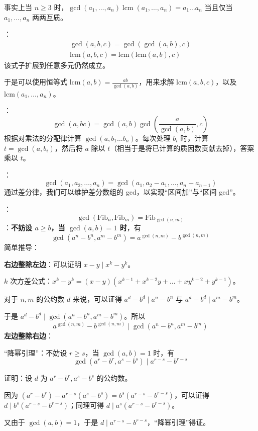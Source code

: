 事实上当 $n \geq 3$ 时，$\gcd(a_1, \dots, a_n) \operatorname{lcm}(a_1, \dots, a_n) = a_1\dots a_n$ 当且仅当 $a_1, \dots, a_n$ 两两互质。

：
\[
\begin{gathered}
\gcd(a, b, c) = \gcd(\gcd(a, b), c) \\
\mathrm{lcm}(a, b, c) = \mathrm{lcm}(\mathrm{lcm}(a, b), c)
\end{gathered}
\]
该式子扩展到任意多元仍然成立。

于是可以使用恒等式 $\mathrm{lcm}(a, b) = \frac{ab}{\gcd(a, b)}$，用来求解 $\mathrm{lcm}(a, b, c)$，以及 $\mathrm{lcm}(a_1, \dots, a_n)$。

：
\[
\gcd(a, bc) = \gcd(a, b) \gcd\left(\frac{a}{\gcd(a, b)}, c\right)
\]
根据对乘法的分配律计算 $\gcd(a, b_1\dots b_n)$。每次处理 $b_i$ 时，计算 $t = \gcd(a, b_i)$，然后将 $a$ 除以 $t$（相当于是将已计算的质因数贡献去掉），答案乘以 $t$。

：
\[
\gcd(a_1, a_2, \dots, a_n) = \gcd(a_1, a_2 - a_1, \dots, a_n - a_{n - 1})
\]
通过差分律，我们可以维护差分数组的 gcd，以实现“区间加”与“区间 gcd”。

：
\[
\gcd(\mathrm{Fib}_n, \mathrm{Fib}_m) = \mathrm{Fib}_{\gcd(n, m)}
\]
：\textbf{不妨设 $a \geq b$，当 $\gcd(a, b) = 1$ 时}，有
\[
\gcd(a^n - b^n, a^m - b^m) = a^{\gcd(n, m)} - b^{\gcd(n, m)}
\]
简单推导：

\textbf{右边整除左边}：可以证明 $x - y \mid x^k - y^k$。

\begin{quoteblock}
$k$ 次方差公式：$x^k - y^k = (x - y)(x^{k - 1} + x^{k - 2}y + \dots + xy^{k - 2} + y^{k - 1})$。
\end{quoteblock}

对于 $n, m$ 的公约数 $d$ 来说，可以证得 $a^d - b^d \mid a^n - b^n$ 与 $a^d - b^d \mid a^m - b^m$。

于是 $a^d - b^d \mid \gcd(a^n - b^n, a^m - b^m)$。所以
\[
a^{\gcd(n, m)} - b^{\gcd(n, m)} \mid \gcd(a^n - b^n, a^m - b^m)
\]
\textbf{左边整除右边}：

\begin{quoteblock}
“降幂引理”：不妨设 $r \geq s$，当 $\gcd(a, b) = 1$ 时，有
\[
\gcd(a^r - b^r, a^s - b^s) \mid a^{r - s} - b^{r - s}
\]

证明：设 $d$ 为 $a^r - b^r, a^s - b^s$ 的公约数。

因为 $(a^r - b^r) - a^{r - s}(a^s - b^s) = b^s(a^{r - s} - b^{r - s})$，可以证得 $d \mid b^s(a^{r - s} - b^{r - s})$；同理可得 $d \mid a^s(a^{r - s} - b^{r - s})$。

又由于 $\gcd(a, b) = 1$，于是 $d \mid a^{r - s} - b^{r - s}$，“降幂引理”得证。
\end{quoteblock}

